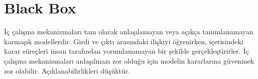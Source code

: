 \section{Black Box}
İç çalışma mekanizmaları tam olarak anlaşılamayan veya açıkça tanımlanamayan karmaşık modellerdir. Girdi ve çıktı arasındaki ilişkiyi öğrenirken, içerisindeki karar süreçleri insan tarafından yorumlanamayan bir şekilde gerçekleştirirler. İç çalışma mekanizmaları anlaşılmazı zor olduğu için modelin kararlarına güvenmek zor olabilir. Açıklanabilirlikleri düşüktür. 

\newpage 